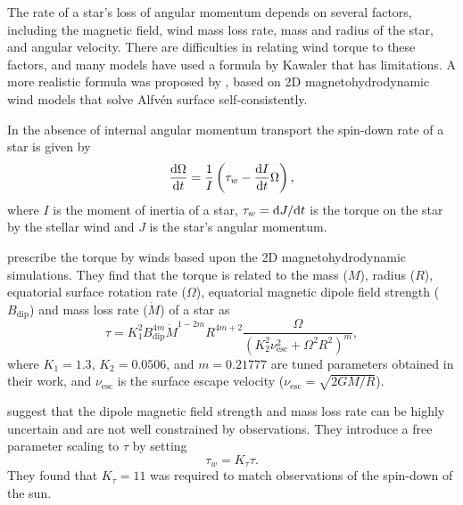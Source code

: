 The rate of a star's loss of angular momentum depends on several factors, including the magnetic field, wind mass loss rate, mass and radius of the star, and angular velocity. 
There are difficulties in relating wind torque to these factors, and many models have used a formula by Kawaler that has limitations. A more realistic formula was proposed by \citep{matt_magnetic_2012}, based on 2D magnetohydrodynamic wind models that solve Alfvén surface self-consistently. 

In the absence of internal angular momentum transport the spin-down rate of a star is given by
\begin{equation}
    \frac{\textmd{d} \Omega}{\textmd{d} t} = \frac{1}{I} \left(\tau_w - \frac{\textmd{d} I}{\textmd{d} t} \Omega\right),
\end{equation}
where $I$ is the moment of inertia of a star, $\tau_w = \textmd{d} J/ \textmd{d} t$ is the torque on the star by the stellar wind and $J$ is the star's angular momentum.

\citet{matt_magnetic_2012} prescribe the torque by winds based upon the 2D magnetohydrodynamic simulations.
They find that the torque is related to the mass ($M$), radius ($R$), equatorial surface rotation rate ($\Omega$), equatorial magnetic dipole field strength ($B_{\text{dip}}$) and mass loss rate ($\Dot{M}$) of a star as
\begin{equation}
    \tau = K_1 ^2 B_{\text{dip}}^{4m} \Dot{M}^{1-2m} R^{4m+2} \frac{\Omega}{\left(K_2 ^2 \nu_{\text{esc}} ^2 + \Omega^2 R^2\right)^m},
    \label{eqn:torque}
\end{equation}
where $K_1 = 1.3$, $K_2 = 0.0506$, and $m = 0.21777$ are tuned parameters obtained in their work, and $\nu_{\text{esc}}$ is the surface escape velocity ($\nu_{\text{esc}} = \sqrt{2GM/R}$).

\citet{johnstone_stellar_2015} suggest that the dipole magnetic field strength and mass loss rate can be highly uncertain and are not well constrained by observations.
They introduce a free parameter scaling to $\tau$ by setting
\begin{equation}
    \tau_w = K_{\tau}\tau.
\end{equation}
They found that $K_{\tau} = 11$ was required to match observations of the spin-down of the sun.

